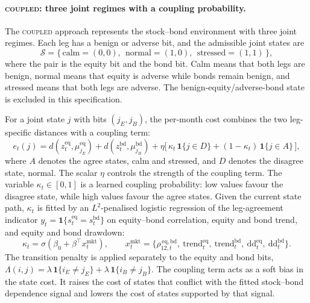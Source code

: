 ﻿\documentclass[10pt]{article}
\newcommand{\zeq}{z^{\mathrm{eq}}_t}
\newcommand{\zbd}{z^{\mathrm{bd}}_t}
\newcommand{\Reg}{\mathcal{S}}
\newcommand{\Acoup}{\textsc{coupled}}
\begin{document}
\paragraph{\Acoup{}: three joint regimes with a coupling probability.}
The \Acoup{} approach represents the stock--bond environment with three joint regimes. Each
leg has a benign or adverse bit, and the admissible joint states are
\[
    \Reg=\{\,\text{calm}=(0,0),\ \ \text{normal}=(1,0),\ \ \text{stressed}=(1,1)\,\},
\]
where the pair is the equity bit and the bond bit. Calm means that both legs are benign,
normal means that equity is adverse while bonds remain benign, and stressed means that both
legs are adverse. The benign-equity/adverse-bond state is excluded in this specification.

For a joint state $j$ with bits $(j_E,j_B)$, the per-month cost combines the two leg-specific
distances with a coupling term:
\begin{equation}
    e_t(j)=d\!\left(\zeq,\mu^{\mathrm{eq}}_{j_E}\right)+d\!\left(\zbd,\mu^{\mathrm{bd}}_{j_B}\right)
    +\eta\Big[\,\kappa_t\,\mathbf{1}\{j\in D\}+(1-\kappa_t)\,\mathbf{1}\{j\in A\}\,\Big],
    \label{eq:emission}
\end{equation}
where $A$ denotes the agree states, calm and stressed, and $D$ denotes the disagree state,
normal. The scalar $\eta$ controls the strength of the coupling term. The variable
$\kappa_t\in[0,1]$ is a learned coupling probability: low values favour the disagree state, while
high values favour the agree states. Given the current state path, $\kappa_t$ is fitted by an
$L^2$-penalised logistic regression of the leg-agreement indicator
$y_t=\mathbf{1}\{s^{\mathrm{eq}}_t=s^{\mathrm{bd}}_t\}$ on equity--bond correlation, equity
and bond trend, and equity and bond drawdown:
\begin{equation}
    \kappa_t=\sigma\!\left(\beta_0+\beta^{\top}x^{\mathrm{mkt}}_t\right),\qquad
    x^{\mathrm{mkt}}_t=\big\{\rho^{\,\mathrm{eq,bd}}_{12,t},\ \mathrm{trend}^{\mathrm{eq}}_t,\
    \mathrm{trend}^{\mathrm{bd}}_t,\ \mathrm{dd}^{\mathrm{eq}}_t,\ \mathrm{dd}^{\mathrm{bd}}_t\big\}.
    \label{eq:wt}
\end{equation}
The transition penalty is applied separately to the equity and bond bits,
$\Lambda(i,j)=\lambda\,\mathbf{1}\{i_E\neq j_E\}+\lambda\,\mathbf{1}\{i_B\neq j_B\}$.
The coupling term acts as a soft bias in the state cost. It raises the cost of states that
conflict with the fitted stock--bond dependence signal and lowers the cost of states
supported by that signal.
\end{document}
